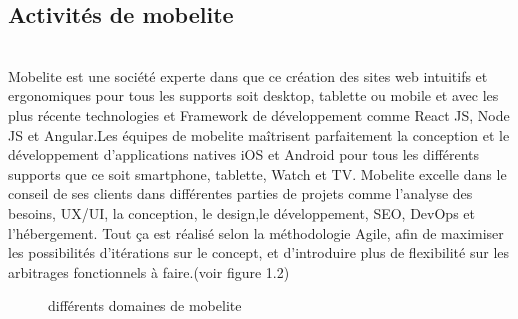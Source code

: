 \subsection{\Large Activités de mobelite}
\texttt{}\\[0.5cm]
\textsf{\selectfont{} Mobelite est une société experte dans que ce création des sites web intuitifs et ergonomiques pour tous les supports soit desktop, tablette ou mobile et avec les plus récente technologies et Framework de développement comme React JS, Node JS et Angular.Les équipes de mobelite maîtrisent parfaitement la conception et le développement d’applications natives iOS et Android pour tous les différents supports que ce soit smartphone, tablette, Watch et TV. Mobelite excelle dans le conseil de ses clients dans différentes parties de projets comme l'analyse des besoins, UX/UI, la conception, le design,le développement, SEO, DevOps et l'hébergement. Tout ça est réalisé selon la méthodologie Agile, afin de maximiser les possibilités d’itérations sur le concept, et d’introduire plus de flexibilité sur les arbitrages fonctionnels à faire.(voir figure 1.2)
}
\texttt{}\\[0.1cm]
\begin{figure}[H]
    \centering
    \caption{différents domaines de mobelite}
    \label{fig:Activités de mobilite}
\end{figure}
\newpage
